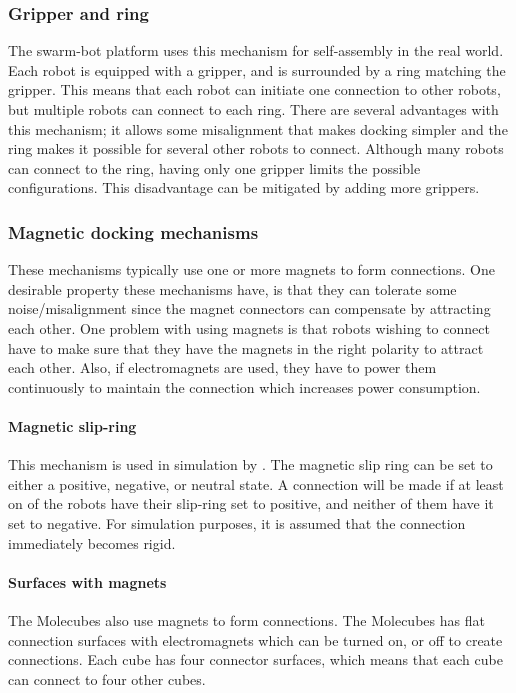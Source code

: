 \subsubsection*{Gripper and ring}
The swarm-bot platform\cite{gro_autonomous_2006} uses this mechanism for self-assembly in the real world.
Each robot is equipped with a gripper, and is surrounded by a ring matching the gripper. 
This means that each robot can initiate one connection to other robots, but multiple robots can connect to each ring.
There are several advantages with this mechanism; it allows some misalignment that makes docking simpler and the ring makes it possible for several other robots to connect.
Although many robots can connect to the ring, having only one gripper limits the possible configurations.
This disadvantage can be mitigated by adding more grippers.

\subsubsection*{Magnetic docking mechanisms}
These mechanisms typically use one or more magnets to form connections.
One desirable property these mechanisms have, is that they can tolerate some noise/misalignment since the magnet connectors can compensate by attracting each other.
One problem with using magnets is that robots wishing to connect have to make sure that they have the magnets in the right polarity to attract each other.
Also, if electromagnets are used, they have to power them continuously to maintain the connection which increases power consumption.

\paragraph*{Magnetic slip-ring}
This mechanism is used in simulation by \cite{weel_emergence_2012}.
The magnetic slip ring can be set to either a positive, negative, or neutral state.
A connection will be made if at least on of the robots have their slip-ring set to positive, and neither of them have it set to negative.
For simulation purposes, it is assumed that the connection immediately becomes rigid.
\paragraph*{Surfaces with magnets}
The Molecubes\cite{studer_spontaneous_2006} also use magnets to form connections.
The Molecubes has flat connection surfaces with electromagnets which can be turned on, or off to create connections.
Each cube has four connector surfaces, which means that each cube can connect to four other cubes.
